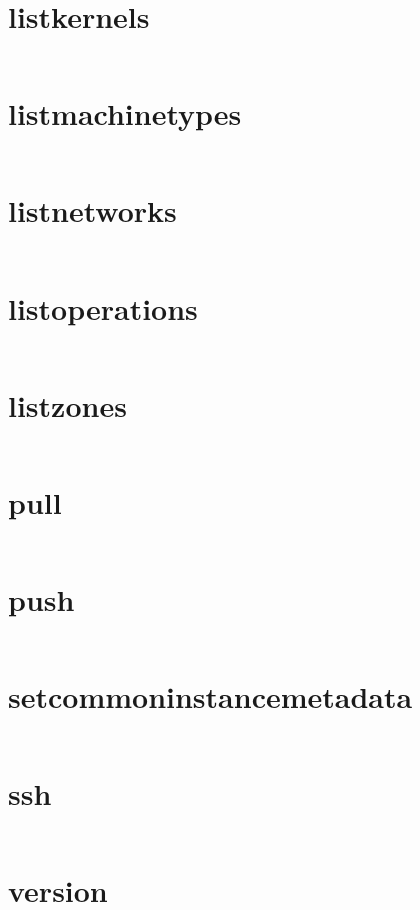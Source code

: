 \section{listkernels}
\begin{lstlisting}[language=Bash]
\end{lstlisting}

\section{listmachinetypes}
\begin{lstlisting}[language=Bash]
\end{lstlisting}

\section{listnetworks}
\begin{lstlisting}[language=Bash]
\end{lstlisting}

\section{listoperations}
\begin{lstlisting}[language=Bash]
\end{lstlisting}

\section{listzones}
\begin{lstlisting}[language=Bash]
\end{lstlisting}

\section{pull}
\begin{lstlisting}[language=Bash]
\end{lstlisting}

\section{push}
\begin{lstlisting}[language=Bash]
\end{lstlisting}

\section{setcommoninstancemetadata}
\begin{lstlisting}[language=Bash]
\end{lstlisting}

\section{ssh}
\begin{lstlisting}[language=Bash]
\end{lstlisting}

\section{version}
\begin{lstlisting}[language=Bash]
\end{lstlisting}


